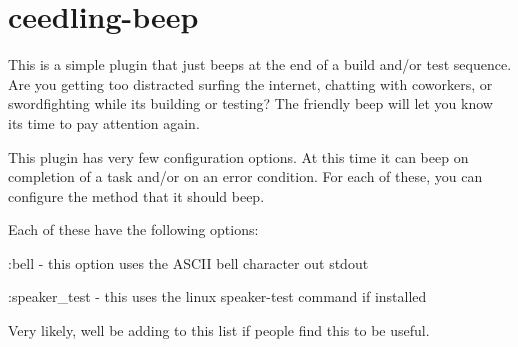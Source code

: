 \chapter{ceedling-\/beep}
\hypertarget{md__unit_test_framework2_2vendor_2ceedling_2plugins_2beep_2_r_e_a_d_m_e}{}\label{md__unit_test_framework2_2vendor_2ceedling_2plugins_2beep_2_r_e_a_d_m_e}
This is a simple plugin that just beeps at the end of a build and/or test sequence. Are you getting too distracted surfing the internet, chatting with coworkers, or swordfighting while it\textquotesingle{}s building or testing? The friendly beep will let you know it\textquotesingle{}s time to pay attention again.

This plugin has very few configuration options. At this time it can beep on completion of a task and/or on an error condition. For each of these, you can configure the method that it should beep.


\begin{DoxyCode}{0}

\end{DoxyCode}


Each of these have the following options\+:


\begin{DoxyItemize}
\item \+:bell -\/ this option uses the ASCII bell character out stdout
\item \+:speaker\+\_\+test -\/ this uses the linux speaker-\/test command if installed
\end{DoxyItemize}

Very likely, we\textquotesingle{}ll be adding to this list if people find this to be useful. 